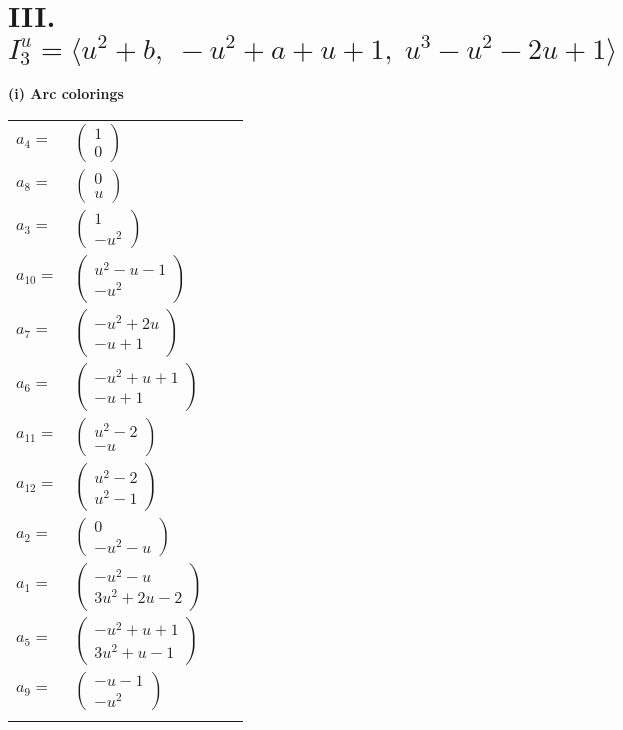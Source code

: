 \documentclass[1p]{elsarticle_modified}
\theoremstyle{definition}
\begin{document}
\centering \section*{III. $I^u_{3}= \langle u^2+b,\;- u^2+a+u+1,\;u^3- u^2-2 u+1 \rangle$}
\flushleft \textbf{(i) Arc colorings}\\
\begin{tabular}{m{7pt} m{180pt} m{7pt} m{180pt} }
\flushright $a_{4}=$&$\begin{pmatrix}1\\0\end{pmatrix}$ \\
\flushright $a_{8}=$&$\begin{pmatrix}0\\u\end{pmatrix}$ \\
\flushright $a_{3}=$&$\begin{pmatrix}1\\- u^2\end{pmatrix}$ \\
\flushright $a_{10}=$&$\begin{pmatrix}u^2- u-1\\- u^2\end{pmatrix}$ \\
\flushright $a_{7}=$&$\begin{pmatrix}- u^2+2 u\\- u+1\end{pmatrix}$ \\
\flushright $a_{6}=$&$\begin{pmatrix}- u^2+u+1\\- u+1\end{pmatrix}$ \\
\flushright $a_{11}=$&$\begin{pmatrix}u^2-2\\- u\end{pmatrix}$ \\
\flushright $a_{12}=$&$\begin{pmatrix}u^2-2\\u^2-1\end{pmatrix}$ \\
\flushright $a_{2}=$&$\begin{pmatrix}0\\- u^2- u\end{pmatrix}$ \\
\flushright $a_{1}=$&$\begin{pmatrix}- u^2- u\\3 u^2+2 u-2\end{pmatrix}$ \\
\flushright $a_{5}=$&$\begin{pmatrix}- u^2+u+1\\3 u^2+u-1\end{pmatrix}$ \\
\flushright $a_{9}=$&$\begin{pmatrix}- u-1\\- u^2\end{pmatrix}$\\&\end{tabular}
\end{document}
